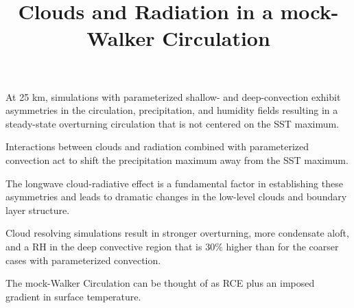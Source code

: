 \documentclass[draft]{agujournal2019}
\begin{document}
\title{Clouds and Radiation in a mock-Walker Circulation}


\begin{keypoints}
  \item{At 25 km, simulations with parameterized shallow- and deep-convection exhibit asymmetries in the circulation, 
  precipitation, and humidity fields resulting in a steady-state overturning circulation that is not centered on the SST
  maximum.}
  \item{Interactions between clouds and radiation combined with parameterized convection act to shift the precipitation 
  maximum away from the SST maximum.}
  \item{The longwave cloud-radiative effect is a fundamental factor in establishing these asymmetries and leads to dramatic
  changes in the low-level clouds and boundary layer structure.}
  \item{Cloud resolving simulations result in stronger overturning, more condensate aloft, and a RH in the deep convective 
  region that is 30\% higher than for the coarser cases with parameterized convection.}
  \item{The mock-Walker Circulation can be thought of as RCE plus an imposed gradient in surface temperature.}
\end{keypoints}
\end{document}
